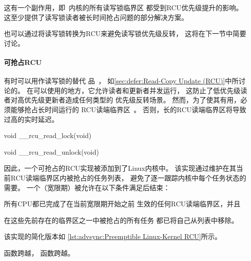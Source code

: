 这有一个副作用，即\rt\ 内核的所有读写锁临界区
都受到RCU优先级提升的影响。
这至少提供了读写锁读者被长时间抢占问题的部分解决方案。

也可以通过将读写锁转换为RCU来避免读写锁优先级反转，
这将在下一节中简要讨论。

\paragraph{可抢占RCU}
有时可以用作读写锁的替代
品~\cite{PaulEMcKenney2007WhatIsRCUFundamentally,PaulMcKenney2012RCUUsage,PaulEMcKenney2024RCUAPI}，
如\cref{sec:defer:Read-Copy Update (RCU)}中所讨论的。
在可以使用的地方，它允许读者和更新者并发运行，
这防止了低优先级读者对高优先级更新者造成任何类型的
优先级反转场景。
然而，为了使其有用，必须能够抢占长时间运行的
RCU读端临界区~\cite{DinakarGuniguntala2008IBMSysJ}。
否则，长的RCU读端临界区将导致过高的实时延迟。

\begin{listing}
\begin{fcvlabel}
\begin{VerbatimL}[commandchars=\\\[\]]
void __rcu_read_lock(void)									\lnlbl[lock:e]

void __rcu_read_unlock(void)		        						\lnlbl[unl:e]
\end{VerbatimL}
\end{fcvlabel}
\caption{可抢占的Linux内核RCU}
\label{lst:advsync:Preemptible Linux-Kernel RCU}
\end{listing}

因此，一个可抢占的RCU实现被添加到了Linux内核中。
该实现通过维护在其当前RCU读端临界区内被抢占的任务列表，
避免了逐一跟踪内核中每个任务状态的需要。
一个（宽限期）被允许在以下条件满足后结束：
\begin{enumerate*}[(1)]
\item 所有CPU都已完成了在当前宽限期开始之前
生效的任何RCU读端临界区，并且
\item 在这些先前存在的临界区之一中被抢占的所有任务
都已将自己从列表中移除。
\end{enumerate*}
该实现的简化版本如
\cref{lst:advsync:Preemptible Linux-Kernel RCU}所示。
\begin{fcvref}
函数跨越，
函数跨越。
\end{fcvref}

